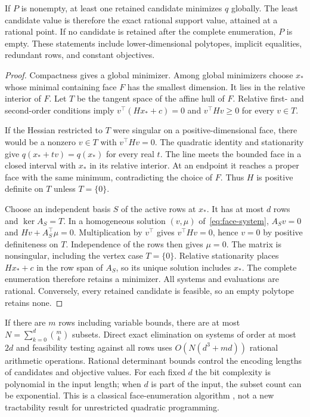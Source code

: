 \begin{theorem}\label{thm:polytope}
If $P$ is nonempty, at least one retained candidate minimizes $q$ globally.
The least candidate value is therefore the exact rational support value,
attained at a rational point. If no candidate is retained after the complete
enumeration, $P$ is empty. These statements include lower-dimensional
polytopes, implicit equalities, redundant rows, and constant objectives.
\end{theorem}
\begin{proof}
Compactness gives a global minimizer. Among global minimizers choose $x_*$
whose minimal containing face $F$ has the smallest dimension. It lies in
the relative interior of $F$. Let $T$ be the tangent space of the affine
hull of $F$. Relative first- and second-order conditions imply
$v^\top(Hx_*+c)=0$ and $v^\top Hv\ge0$ for every $v\in T$.

If the Hessian restricted to $T$ were singular on a positive-dimensional
face, there would be a nonzero $v\in T$ with $v^\top Hv=0$.
The quadratic identity and stationarity give
$q(x_*+tv)=q(x_*)$ for every real $t$. The line meets the bounded
face in a closed interval with $x_*$ in its relative interior. At an
endpoint it reaches a proper face with the same minimum, contradicting
the choice of $F$. Thus $H$ is positive definite on $T$ unless $T=\{0\}$.

Choose an independent basis $S$ of the active rows at $x_*$. It has at
most $d$ rows and $\ker A_S=T$. In a homogeneous solution $(v,\mu)$
of~\eqref{eq:face-system}, $A_Sv=0$ and
$Hv+A_S^\top\mu=0$. Multiplication by $v^\top$ gives
$v^\top Hv=0$, hence $v=0$ by positive definiteness on $T$.
Independence of the rows then gives $\mu=0$. The matrix is nonsingular,
including the vertex case $T=\{0\}$. Relative stationarity places
$Hx_*+c$ in the row span of $A_S$, so its unique solution includes
$x_*$. The complete enumeration therefore retains a minimizer.
All systems and evaluations are rational. Conversely, every retained
candidate is feasible, so an empty polytope retains none.
\end{proof}

If there are $m$ rows including variable bounds, there are at most
$N=\sum_{k=0}^d\binom{m}{k}$ subsets. Direct exact elimination on
systems of order at most $2d$ and feasibility testing against all rows
uses $O(N(d^3+md))$ rational arithmetic operations. Rational determinant
bounds control the encoding lengths of candidates and objective values.
For each fixed $d$ the bit complexity is polynomial in the input length;
when $d$ is part of the input, the subset count can be exponential.
This is a classical face-enumeration algorithm
\cite[Section 2.9]{Murty1997}, not a new tractability result for
unrestricted quadratic programming.

